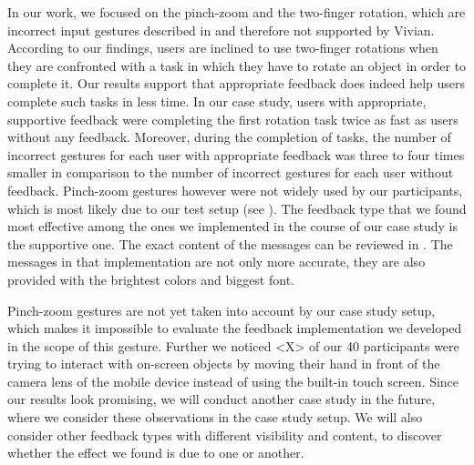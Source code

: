 \documentclass[11pt, a4paper]{article}
\begin{document}
		In our work, we focused on the pinch-zoom and the two-finger rotation, which are incorrect input gestures described in  and therefore not supported by Vivian. According to our findings, users are inclined to use two-finger rotations when they are confronted with a task in which they have to rotate an object in order to complete it. Our results support that appropriate feedback does indeed help users complete such tasks in less time. In our case study, users with appropriate, supportive feedback were completing the first rotation task twice as fast as users without any feedback. Moreover, during the completion of tasks, the number of incorrect gestures for each user with appropriate feedback was three to four times smaller in comparison to the number of incorrect gestures for each user without feedback. Pinch-zoom gestures however were not widely used by our participants, which is most likely due to our test setup (see ). The feedback type that we found most effective among the ones we implemented in the course of our case study is the supportive one. The exact content of the messages can be reviewed in . The messages in that implementation are not only more accurate, they are also provided with the brightest colors and biggest font.

		Pinch-zoom gestures are not yet taken into account by our case study setup, which makes it impossible to evaluate the feedback implementation we developed in the scope of this gesture. Further we noticed <X> of our 40 participants were trying to interact with on-screen objects by moving their hand in front of the camera lens of the mobile device instead of using the built-in touch screen. Since our results look promising, we will conduct another case study in the future, where we consider these observations in the case study setup. We will also consider other feedback types with different visibility and content, to discover whether the effect we found is due to one or another.

	\pagebreak
	\printbibliography
\restoregeometry
\end{document}
